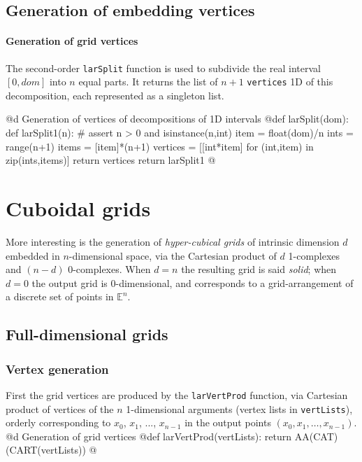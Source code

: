 \documentclass[11pt,oneside]{article}	%
\def\E{\mathbb{E}}
\begin{document}
\subsection{Generation of embedding vertices}

\paragraph{Generation of grid vertices}
The second-order \texttt{larSplit} function is used to subdivide the real interval $[0,dom]$ into $n$ equal parts. It returns the list of $n+1$ \texttt{vertices} 1D of this decomposition, each represented as a singleton list. 

@d Generation of vertices of decompositions of 1D intervals 
@{def larSplit(dom):
    def larSplit1(n):
        # assert n > 0 and isinstance(n,int)
        item = float(dom)/n
        ints = range(n+1)
        items = [item]*(n+1)
        vertices = [[int*item] for (int,item) in zip(ints,items)]
        return vertices
    return larSplit1
@}


\section{Cuboidal grids}
\label{sec:cuboids}

More interesting is the generation of \emph{hyper-cubical grids} of intrinsic dimension $d$ embedded in $n$-dimensional space, via the Cartesian product of $d$ 1-complexes and $(n-d)$ 0-complexes. When $d=n$ the resulting grid is said \emph{solid}; when $d=0$ the output grid is 0-dimensional, and corresponds to a grid-arrangement of a discrete set of points in $\E^n$.


\subsection{Full-dimensional grids}

\subsubsection{Vertex generation}

First the grid vertices are produced by the \texttt{larVertProd} function, via Cartesian product of vertices of the $n$ 1-dimensional arguments (vertex lists in \texttt{vertLists}), orderly corresponding to $x_0$, $x_1$, ..., $x_{n-1}$ in the output points $(x_0, x_1,\ldots,x_{n-1})$.
@d Generation of grid vertices 
@{def larVertProd(vertLists):
    return AA(CAT)(CART(vertLists))
@}
\end{document}
